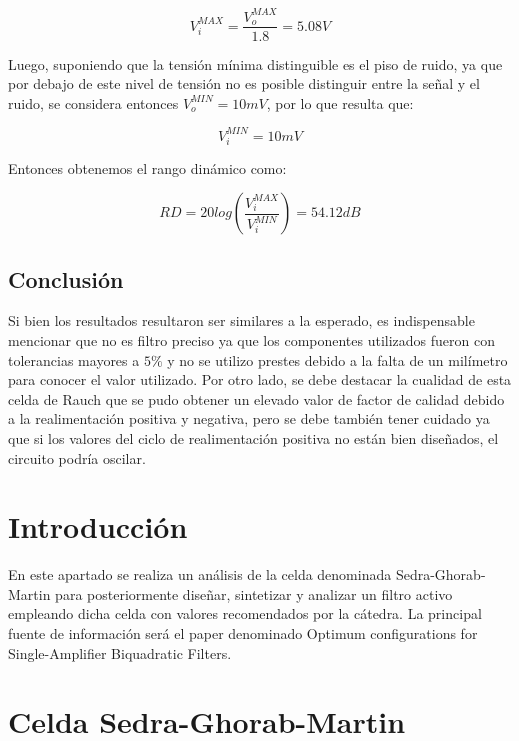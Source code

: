 \begin{equation}
    V_i^{MAX} = \frac{V_o^{MAX}}{1.8} = 5.08V
\end{equation}

Luego, suponiendo que la  tensi\'on m\'inima distinguible es el piso de ruido, ya que por debajo de este nivel de tensi\'on no es posible distinguir entre la se\~nal y el ruido, se considera entonces $V_o^{MIN}=10mV$, por lo que resulta que:

\begin{equation}
    V_i^{MIN} = 10mV
\end{equation}

Entonces obtenemos el rango dinámico como:

\begin{equation}
    RD = 20log(\frac{V_i^{MAX}}{V_i^{MIN}})= 54.12dB
\end{equation}

\subsection{Conclusión}

Si bien los resultados resultaron ser similares a la esperado, es indispensable mencionar que no es filtro preciso ya que los componentes utilizados fueron con tolerancias mayores a $5\%$ y no se utilizo prestes debido a la falta de un milímetro para conocer el valor utilizado. Por otro lado, se debe destacar la cualidad de esta celda de Rauch que se pudo obtener un elevado valor de factor de calidad debido a la realimentación positiva y negativa, pero se debe también tener cuidado ya que si los valores del ciclo de realimentación positiva no están bien diseñados, el circuito podría oscilar.


\section{Introducción}

En este apartado se realiza un análisis de la celda denominada Sedra-Ghorab-Martin para posteriormente diseñar, sintetizar y analizar un filtro activo empleando dicha celda con valores recomendados por la cátedra. La principal fuente de información será el paper denominado Optimum configurations for Single-Amplifier Biquadratic Filters.

\section{Celda Sedra-Ghorab-Martin}

